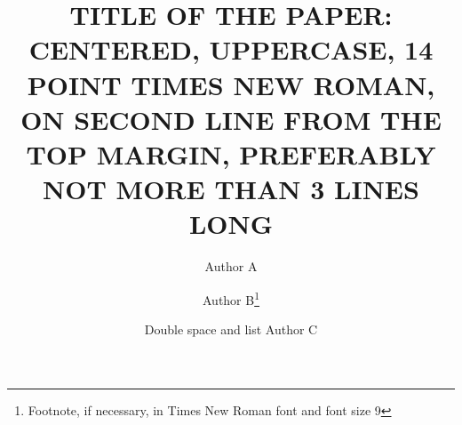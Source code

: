 \documentclass{ansconf}
\begin{document}
\title{TITLE OF THE PAPER: CENTERED, UPPERCASE, 14 POINT TIMES NEW ROMAN, ON
  SECOND LINE FROM THE TOP MARGIN, PREFERABLY NOT MORE THAN 3 LINES LONG}

\author{Author A}
\author{Author B\footnote{Footnote, if necessary, in Times 
  New Roman font and font size 9}}

\author{Double space and list Author C}

\maketitle
\end{document}
